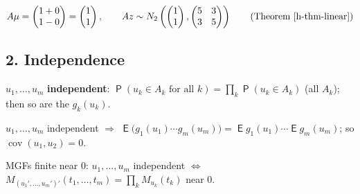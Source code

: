 \documentclass[12pt]{article}
\DeclareMathOperator\prb{\mathsf{P}}
\DeclareMathOperator\expc{\mathsf{E}}
\DeclareMathOperator\var{var}
\DeclareMathOperator\cov{cov}
\theoremstyle{definition}
\begin{document}
\begin{board}[\(A=\left(\begin{smallmatrix}1&1&0&0\\1&-1&0&0\end{smallmatrix}\right)\), \(Az=(z_1+z_2,z_1-z_2)'\);
\(A\Sigma A'=\var(Az)\) (\lec{9}, \lit{Theorem~3}(b): \(\var(Az+b)=A\var(z)A'\)); \(\var(z_1+z_2)=\var(z_1-z_2)=5\),
\(\cov(z_1+z_2,z_1-z_2)=3\) (\lec{9}, \lit{Example~5}):]
\[
A\mu=\begin{pmatrix}1+0\\1-0\end{pmatrix}=\begin{pmatrix}1\\1\end{pmatrix},\qquad
Az\sim N_2\left(\begin{pmatrix}1\\1\end{pmatrix},\begin{pmatrix}5&3\\3&5\end{pmatrix}\right)\qquad
\text{(Theorem~\ref{h-thm-linear})}
\]
\end{board}

\subsection*{2. Independence}

\begin{facts}[start=3]
\item\label{f-indep} \(u_1,\dots,u_m\) \textbf{independent}: \(\prb(u_k\in A_k\text{ for all }k)=\prod_k\prb(u_k\in
A_k)\) (all \(A_k\)); then so are the \(g_k(u_k)\).
\item\label{f-product} \(u_1,\dots,u_m\) independent \(\Rightarrow\)
\(\expc\bigl(g_1(u_1)\cdots g_m(u_m)\bigr)=\expc g_1(u_1)\cdots\expc g_m(u_m)\); so \(\cov(u_1,u_2)=0\).
\item\label{f-factor} MGFs finite near \(0\): \(u_1,\dots,u_m\) independent \(\iff\)
\(M_{(u_1',\dots,u_m')'}(t_1,\dots,t_m)=\prod_kM_{u_k}(t_k)\) near \(0\).
\end{facts}
\end{document}

